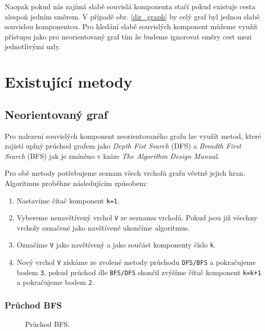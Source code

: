 \documentclass[12pt]{article}
\begin{document}
Naopak pokud nás zajímá slabě souvislá komponenta stačí pokud existuje cesta alespoň jedním směrem. V případě obr. \ref{dir_graph} by celý graf byl jednou slabě souvislou komponentou. Pro hledání slabě souvislých komponent můžeme využít přístupu jako pro neorientovaný graf tím že budeme ignorovat směry cest mezi jednotlivými uzly.

\section{Existující metody}
\subsection{Neorientovaný graf}
\label{non_dir_graph_EM}
Pro nalezení souvislých komponent neorientovaného grafu lze využít metod, které zajistí uplný průchod grafem jako \textit{Depth Fist Search} (DFS) a \textit{Breadth First Search} (BFS) jak je zmíněno v knize \textit{The Algorithm Design Manual\cite{Skina}}. 

Pro obě metody potřebujeme seznam všech vrcholů grafu včetně jejich hran. Algoritmus proběhne následujícím způsobem:

\begin{enumerate}
\setlength\itemsep{1px}
\item Nastavíme čítač komponent \texttt{k=1}.
\item Vybereme nenavštívený vrchol \texttt{V} ze seznamu vrcholů. Pokud jsou již všechny vrcholy označené jako navštívené ukončíme algoritmus.
\item Označíme \texttt{V} jako navštívený a jako součást komponenty číslo \texttt{k}.
\item Nový vrchol \texttt{V} získáme ze zvolené metody průchodu \texttt{DFS/BFS} a pokračujeme bodem \texttt{3}, pokud průchod dle \texttt{BFS/DFS} skončil zvýšíme čítač komponent \texttt{k=k+1} a pokračujeme bodem \texttt{2}.
\end{enumerate}

\subsubsection{Průchod BFS}
\label{BFS}

\begin{figure}
\caption{Průchod BFS.}
\label{bfs_graph}
\end{figure}
\end{document}
